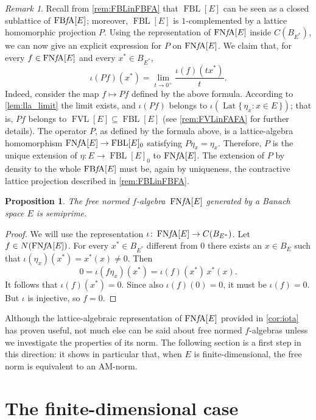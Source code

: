 \documentclass{memo-l}
\newtheorem{prop}[theorem]{Proposition}
\theoremstyle{definition}
\theoremstyle{remark}
\newtheorem{rem}[theorem]{Remark}
\numberwithin{section}{chapter}
\numberwithin{equation}{chapter}
\newcommand{\falg}{$f\!$-algebra}
\newcommand{\FNFA}[1]{\operatorname{FN{\it f}\!A}[#1]}
\newcommand{\FBFA}[1]{\operatorname{FB{\it f}\!A}[#1]}
\newcommand{\FVLv}[1]{\operatorname{FVL}[#1]}
\newcommand{\FBL}[1]{\operatorname{FBL}[#1]}
\DeclareMathOperator{\Lat}{Lat}
\begin{document}
\begin{rem}
    Recall from \cref{rem:FBLinFBFA} that $\FBL E$ can be seen
    as a closed sublattice of $\FBFA E$; moreover, $\FBL E$ is
    $1$-complemented by a lattice homomorphic projection $P$. Using the
    representation of $\FNFA E$ inside $C(B_{E^{*}})$, we can now give an explicit
    expression for $P$ on $\FNFA E$. We claim that, for every $f \in
    \FNFA E$ and every $x^{*}\in B_{E^{*}}$,
    \[
        \iota (Pf)(x^{*})=\lim_{t\to 0^{+}} \frac{\iota (f)(tx^{*})}{t}.
    \]
    Indeed, consider the map $f\mapsto Pf$ defined by the above
    formula.
    According to \cref{lem:lla_limit} the limit exists, and $\iota
    (Pf)$ belongs to $\iota (\Lat \{\, \eta _x : x \in
    E\, \})$; that is, $Pf$ belongs to $\FVLv E\subseteq \FBL E$ (see
    \cref{rem:FVLinFAFA} for further details). The operator $P$, as defined by the formula above,
    is a lattice-algebra homomorphism $\FNFA E\to \FBL E_0$
    satisfying $P \eta _x =\eta _x$. Therefore, $P$ is the unique
    extension of $\eta \colon E\to {\FBL E}_0$ to $\FNFA E$. The extension of
    $P$ by density to the whole $\FBFA E$ must be, again by
    uniqueness, the contractive lattice projection described in
    \cref{rem:FBLinFBFA}.
\end{rem}

\begin{prop}\label{prop:FNFAsemiprime}
    The free normed \falg\ $\FNFA E$ generated by a Banach space $E$
    is semiprime.
\end{prop}
\begin{proof}
    We will use the representation $\iota \colon \FNFA E\to
    C(B_{E^{*}})$.
    Let $f \in N(\FNFA E)$. For every $x^{*}\in B_{E^{*}}$ different
    from $0$ there exists an $x \in B_E$ such that $\iota (\eta
    _x)(x^{*})=x^{*}(x)\neq 0$. Then
    \[
    0=\iota (f\eta _x)(x^{*})=\iota (f)(x^{*})\,x^{*}(x).
    \]
    It follows that $\iota (f)(x^{*})=0$. Since also $\iota (f)(0)=0$,
    it must be $\iota (f)=0$. But $\iota $ is injective, so $f=0$.
\end{proof}

Although the lattice-algebraic representation of $\FNFA E$ provided in
\cref{cor:iota} has proven useful, not much else can be said about
free normed \falg s unless we investigate the properties of its
norm. The following section is a first step in this direction: it
shows in particular that, when $E$ is finite-dimensional, the free norm
is equivalent to an AM-norm.

\section{The finite-dimensional case}\label{sec:fin_dim}
\end{document}
